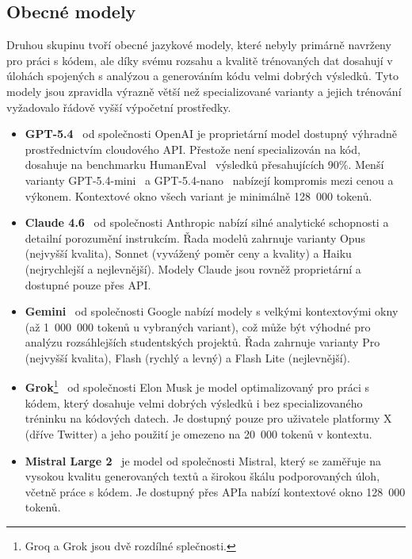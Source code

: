\subsection{Obecné modely}
\label{subsec:models-general}

Druhou skupinu tvoří obecné jazykové modely, které nebyly primárně navrženy pro práci s kódem, ale díky svému rozsahu a kvalitě trénovaných dat dosahují v úlohách spojených s analýzou a generováním kódu velmi dobrých výsledků.
Tyto modely jsou zpravidla výrazně větší než specializované varianty a jejich trénování vyžadovalo řádově vyšší výpočetní prostředky.

\begin{itemize}
    \item \textbf{GPT-5.4}~\cite{gpt-5.4} od společnosti OpenAI je proprietární model dostupný výhradně prostřednictvím cloudového API\@.
    Přestože není specializován na kód, dosahuje na benchmarku HumanEval~\cite{humaneval} výsledků přesahujících 90\%.
    Menší varianty GPT-5.4-mini~\cite{gpt-5.4-mini} a GPT-5.4-nano~\cite{gpt-5.4-nano} nabízejí kompromis mezi cenou a výkonem.
    Kontextové okno všech variant je minimálně 128~000 tokenů.

    \item \textbf{Claude 4.6}~\cite{claude-opus-4.6,claude-sonnet-4.6, claude-3.5} od společnosti Anthropic nabízí silné analytické schopnosti a detailní porozumění instrukcím.
    Řada modelů zahrnuje varianty Opus (nejvyšší kvalita), Sonnet (vyvážený poměr ceny a kvality) a Haiku (nejrychlejší a nejlevnější).
    Modely Claude jsou rovněž proprietární a dostupné pouze přes API\@.

    \item \textbf{Gemini}~\cite{geminy-3.1-pro,geminy-3-flash} od společnosti Google nabízí modely s velkými kontextovými okny (až 1~000~000 tokenů u vybraných variant), což může být výhodné pro analýzu rozsáhlejších studentských projektů.
    Řada zahrnuje varianty Pro (nejvyšší kvalita), Flash (rychlý a levný) a Flash Lite (nejlevnější).

    \item \textbf{Grok}\footnote{Groq a Grok jsou dvě rozdílné splečnosti.}~\cite{grok-2} od společnosti Elon Musk je model optimalizovaný pro práci s kódem, který dosahuje velmi dobrých výsledků i bez specializovaného tréninku na kódových datech.
    Je dostupný pouze pro uživatele platformy X (dříve Twitter) a jeho použití je omezeno na 20~000 tokenů v kontextu.

    \item \textbf{Mistral Large 2}~\cite{mistral-large-2} je model od společnosti Mistral, který se zaměřuje na vysokou kvalitu generovaných textů a širokou škálu podporovaných úloh, včetně práce s kódem.
    Je dostupný přes API\@ a nabízí kontextové okno 128~000 tokenů.
\end{itemize}

